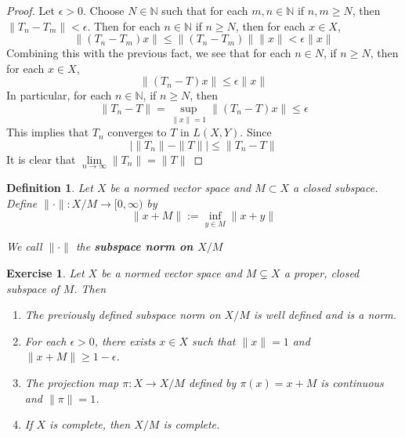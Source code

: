 \documentclass[12pt]{amsart}
\newtheorem{defn}[thm]{Definition}
\newtheorem{ex}[thm]{Exercise}
\newcommand{\ep}{\epsilon}
\newcommand{\N}{\mathbb{N}}
\newcommand{\Rg}{[0,\infty)}
\newcommand{\limn}{\lim \limits_{n \rightarrow \infty}}
\begin{document}
\begin{proof}
		Let $\ep >0 $. Choose $N \in \N$ such that for each $m, n \in \N$ if $n,m \geq N$, then $\|T_n - T_m \|< \ep$. Then for each $n \in \N$ if $n \geq N$, then for each $x \in X$, $$\|(T_n-T_m)x\|\leq \|(T_n-T_m)\|\|x \|< \ep \|x\|$$ Combining this with the previous fact, we see that for each $n \in N$, if $n \geq N$, then for each $x \in X$, $$\|(T_n -T) x\|\leq \ep \|x \|$$ In particular, for each $n \in \N$, if $n \geq N$, then $$ \|T_n -T \|= \sup\limits_{\|x \|= 1}\|(T_n - T)x \|\leq \ep$$ This implies that $T_n$ converges to $T$ in $L(X,Y)$. 
		Since $$\big\vert \|T_n \|- \|T \|\big \vert \leq \|T_n - T \|$$ It is clear that $\limn \|T_n \|= \|T \|$
	\end{proof}
	
	\begin{defn}
		Let $X$ be a normed vector space and $M \subset X$ a closed subspace. Define $\|\cdot\|:X/M \rightarrow \Rg$ by $$\|x+M\| := \inf_{y \in M}\|x+y\|$$
		
		We call $\|\cdot\|$ the \textbf{subspace norm on $X/M$}
	\end{defn}
	
	\begin{ex}
		Let $X$ be a normed vector space and $M \subsetneq X$ a proper, closed subspace of $M$. 
		Then 
		\begin{enumerate}
			\item The previously defined subspace norm on $X/M$ is well defined and is a norm. 
			\item For each $\ep > 0$, there exists $x \in X$ such that $\|x\|=1$ and $\|x+M\| \geq 1-\ep$.
			\item The projection map $\pi:X \rightarrow X/M$ defined by $\pi(x) = x+M$ is continuous and $\|\pi\|=1$. 
			\item If $X$ is complete, then $X/M$ is complete. 
		\end{enumerate} 
	\end{ex}
	
\end{document}

